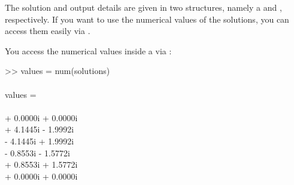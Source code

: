 \documentclass{manual}
\begin{document}
            The solution and output details are given in two structures, namely a  and , respectively.
            If you want to use the numerical values of the solutions, you can access them easily via .
            \begin{code}
                You access the numerical values inside a  via :
                \begin{codeblock}
                    >> values = num(solutions) \\ \phantom{-} \\
                    values = \\ \phantom{-} \\
                     + 0.0000i  + 0.0000i \\
                     + 4.1445i  - 1.9992i \\
                     - 4.1445i  + 1.9992i \\
                     - 0.8553i  - 1.5772i \\
                     + 0.8553i  + 1.5772i \\
                     + 0.0000i  + 0.0000i 
                \end{codeblock}
            \end{code} 
\end{document}

